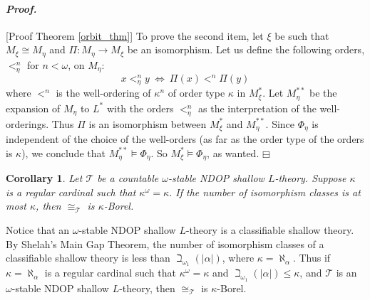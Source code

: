 \documentclass[12pt,a4paper]{amsart}
\newtheorem{cor}[thm]{Corollary}
\theoremstyle{definition}
\theoremstyle{remark}
\newenvironment{cproof}{\paragraph{\emph{Proof.\,}}}{\hfill{$\boxminus$}\par\vspace{2mm}}
\begin{document}
\begin{cproof}[Proof Theorem \ref{orbit_thm}]
To prove the second item, let $\xi$ be such that $M_\xi\cong M_\eta$ and $\Pi: M_\eta \rightarrow M_\xi$ be an isomorphism. 
Let us define the following orders, $<^{n}_\eta$ for $n<\omega$, on $M_\eta$: $$x<^{n}_\eta y\ \Leftrightarrow\ \Pi(x)<^n \Pi(y)$$
where $<^n$ is the well-ordering of $\kappa^n$ of order type $\kappa$ in $M^*_\xi$. 
Let $M_\eta^{**}$ be the expansion of $M_\eta$ to $L^*$ with the orders $<^{n}_\eta$ as the interpretation of the well-orderings. Thus $\Pi$ is an isomorphism between $M_\xi^*$ and $M_\eta^{**}$. %
Since $\Phi_\eta$ is independent of the choice of the well-orders (as far as the order type of the orders is $\kappa$), we conclude that $M_\eta^{**}\models \Phi_\eta$. So $M_\xi^{*}\models \Phi_\eta$, as wanted.
\end{cproof}

\begin{cor}\label{cor515}
    Let $\mathcal{T}$ be a countable $\omega$-stable NDOP shallow $L$-theory. Suppose $\kappa$ is a regular cardinal such that $\kappa^\omega=\kappa$. If the number of isomorphism classes is at most $\kappa$, then $\cong_\mathcal{T}$ is $\kappa$-Borel.
\end{cor}

Notice that an $\omega$-stable NDOP shallow $L$-theory is a classifiable shallow theory. By Shelah's Main Gap Theorem, the number of isomorphism classes of a classifiable shallow theory is less than $\beth_{\omega_1}(|\alpha|)$, where $\kappa=\aleph_\alpha$. Thus if $\kappa=\aleph_\alpha$ is a regular cardinal such that $\kappa^\omega=\kappa$ and $\beth_{\omega_1}(|\alpha|)\leq \kappa$, and $\mathcal{T}$ is an $\omega$-stable NDOP shallow $L$-theory, then $\cong_\mathcal{T}$ is $\kappa$-Borel. 
\end{document}

